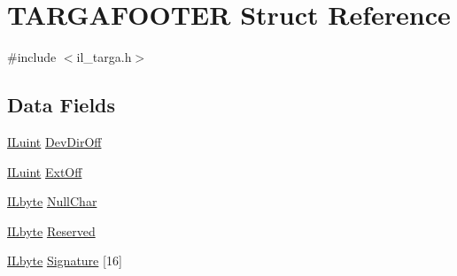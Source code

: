 \hypertarget{struct_t_a_r_g_a_f_o_o_t_e_r}{\section{T\-A\-R\-G\-A\-F\-O\-O\-T\-E\-R Struct Reference}
\label{struct_t_a_r_g_a_f_o_o_t_e_r}
}


{\ttfamily \#include $<$il\-\_\-targa.\-h$>$}

\subsection*{Data Fields}
\begin{DoxyCompactItemize}
\item 
\hyperlink{il_8h_ac6508d0e9c19e32f32e00d54b5b8cf30}{I\-Luint} \hyperlink{struct_t_a_r_g_a_f_o_o_t_e_r_a44a48dc5d2dd7652d60d1a7226569d87}{Dev\-Dir\-Off}
\item 
\hyperlink{il_8h_ac6508d0e9c19e32f32e00d54b5b8cf30}{I\-Luint} \hyperlink{struct_t_a_r_g_a_f_o_o_t_e_r_a24ce44fbc10df1024a27d4133ae36146}{Ext\-Off}
\item 
\hyperlink{il_8h_a88e562dacd22f4efcf6f9d31b85d4f92}{I\-Lbyte} \hyperlink{struct_t_a_r_g_a_f_o_o_t_e_r_aa1098a73cd62788d2271cf8d4aa1ead0}{Null\-Char}
\item 
\hyperlink{il_8h_a88e562dacd22f4efcf6f9d31b85d4f92}{I\-Lbyte} \hyperlink{struct_t_a_r_g_a_f_o_o_t_e_r_ab6150438e6c8472cf5a30cea85596dcf}{Reserved}
\item 
\hyperlink{il_8h_a88e562dacd22f4efcf6f9d31b85d4f92}{I\-Lbyte} \hyperlink{struct_t_a_r_g_a_f_o_o_t_e_r_af0dd63484b3bd69b4320574ee76724a1}{Signature} \mbox{[}16\mbox{]}
\end{DoxyCompactItemize}


